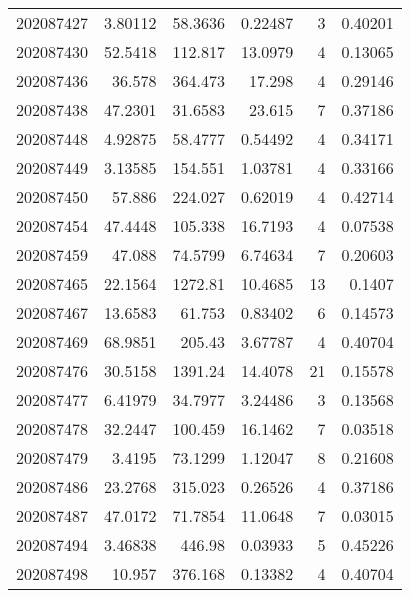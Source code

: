 \begin{tabular}{rrrrrr}
 202087427 &          3.80112 &       58.3636 &            0.22487 &           3 & 0.40201 \\
 202087430 &         52.5418  &      112.817  &           13.0979  &           4 & 0.13065 \\
 202087436 &         36.578   &      364.473  &           17.298   &           4 & 0.29146 \\
 202087438 &         47.2301  &       31.6583 &           23.615   &           7 & 0.37186 \\
 202087448 &          4.92875 &       58.4777 &            0.54492 &           4 & 0.34171 \\
 202087449 &          3.13585 &      154.551  &            1.03781 &           4 & 0.33166 \\
 202087450 &         57.886   &      224.027  &            0.62019 &           4 & 0.42714 \\
 202087454 &         47.4448  &      105.338  &           16.7193  &           4 & 0.07538 \\
 202087459 &         47.088   &       74.5799 &            6.74634 &           7 & 0.20603 \\
 202087465 &         22.1564  &     1272.81   &           10.4685  &          13 & 0.1407  \\
 202087467 &         13.6583  &       61.753  &            0.83402 &           6 & 0.14573 \\
 202087469 &         68.9851  &      205.43   &            3.67787 &           4 & 0.40704 \\
 202087476 &         30.5158  &     1391.24   &           14.4078  &          21 & 0.15578 \\
 202087477 &          6.41979 &       34.7977 &            3.24486 &           3 & 0.13568 \\
 202087478 &         32.2447  &      100.459  &           16.1462  &           7 & 0.03518 \\
 202087479 &          3.4195  &       73.1299 &            1.12047 &           8 & 0.21608 \\
 202087486 &         23.2768  &      315.023  &            0.26526 &           4 & 0.37186 \\
 202087487 &         47.0172  &       71.7854 &           11.0648  &           7 & 0.03015 \\
 202087494 &          3.46838 &      446.98   &            0.03933 &           5 & 0.45226 \\
 202087498 &         10.957   &      376.168  &            0.13382 &           4 & 0.40704 \\

\end{tabular}
